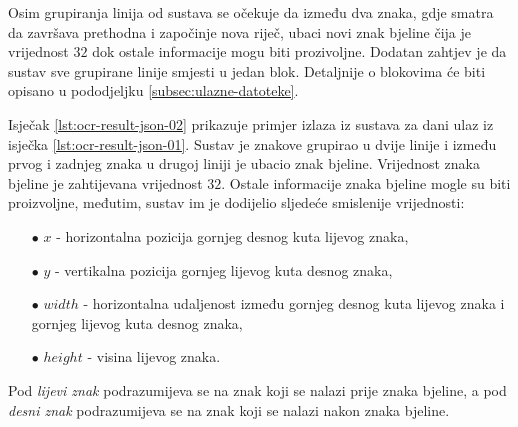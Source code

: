 \documentclass[times, utf8, zavrsni]{fer}
\begin{document}
Osim grupiranja linija od sustava se očekuje da između dva znaka, gdje smatra da
završava prethodna i započinje nova riječ, ubaci novi znak bjeline čija je
vrijednost  $32$ dok ostale informacije mogu biti prozivoljne.
Dodatan zahtjev je da sustav sve grupirane linije smjesti u jedan blok.
Detaljnije o blokovima će biti opisano u pododjeljku
\ref{subsec:ulazne-datoteke}.

Isječak \ref{lst:ocr-result-json-02} prikazuje primjer izlaza iz sustava za dani
ulaz iz isječka \ref{lst:ocr-result-json-01}. Sustav je znakove grupirao u dvije
linije i između prvog i zadnjeg znaka u drugoj liniji je ubacio znak bjeline.
Vrijednost znaka bjeline je zahtijevana vrijednost $32$. Ostale informacije
znaka bjeline mogle su biti proizvoljne, međutim, sustav im je dodijelio
sljedeće smislenije vrijednosti:\begin{itemize}
    \item[$\bullet$] $x$ - horizontalna pozicija gornjeg desnog kuta lijevog
                           znaka,
    \item[$\bullet$] $y$ - vertikalna pozicija gornjeg lijevog kuta desnog
                           znaka,
    \item[$\bullet$] $width$ - horizontalna udaljenost između gornjeg desnog
                               kuta lijevog znaka i gornjeg lijevog kuta desnog
                               znaka,
    \item[$\bullet$] $height$ - visina lijevog znaka.
\end{itemize}

Pod \emph{lijevi znak} podrazumijeva se na znak koji se nalazi prije znaka
bjeline, a pod \emph{desni znak} podrazumijeva se na znak koji se nalazi nakon
znaka bjeline.
\end{document}

